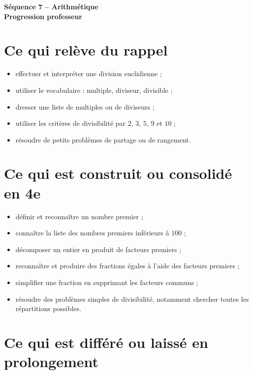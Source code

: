 \documentclass[12pt,a4paper]{article}
\newcommand{\titreseq}[1]{%
\begin{center}
{\sffamily\LARGE\bfseries\color{TitreC}Séquence 7 -- Arithmétique}\\[0.2em]
{\sffamily\large\bfseries\color{SavoirC}#1}
\end{center}}
\begin{document}
\titreseq{Progression professeur}


\section*{Ce qui relève du rappel}

\begin{itemize}
  \item effectuer et interpréter une division euclidienne ;
  \item utiliser le vocabulaire : multiple, diviseur, divisible ;
  \item dresser une liste de multiples ou de diviseurs ;
  \item utiliser les critères de divisibilité par \(2\), \(3\), \(5\), \(9\) et \(10\) ;
  \item résoudre de petits problèmes de partage ou de rangement.
\end{itemize}

\section*{Ce qui est construit ou consolidé en 4e}

\begin{itemize}
  \item définir et reconnaître un nombre premier ;
  \item connaître la liste des nombres premiers inférieurs à \(100\) ;
  \item décomposer un entier en produit de facteurs premiers ;
  \item reconnaître et produire des fractions égales à l'aide des facteurs premiers ;
  \item simplifier une fraction en supprimant les facteurs communs ;
  \item résoudre des problèmes simples de divisibilité,
        notamment chercher toutes les répartitions possibles.
\end{itemize}

\section*{Ce qui est différé ou laissé en prolongement}
\end{document}
